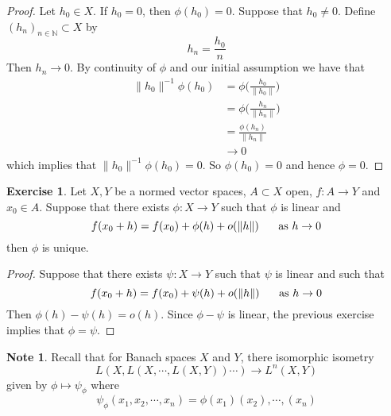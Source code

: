 \documentclass[12pt]{amsart}
\theoremstyle{definition}
\newtheorem{note}[definition]{Note}
\newtheorem{ex}[definition]{Exercise}
\newcommand{\N}{\mathbb{N}}
\DeclareMathOperator*{\0}{\mbf{0}}
\DeclareMathOperator*{\1}{\mbf{1}}
\newcommand{\lex}[1]{\label{ex:#1}}
\begin{document}
	\begin{proof}
	Let $h_0 \in X$. If $h_0 = 0$, then $\phi(h_0) = 0$. Suppose that $h_0 \neq 0$. Define $(h_n)_{n \in \N} \subset X$ by $$h_n = \frac{h_0}{n}$$ Then $h_n \rightarrow 0$. By continuity of $\phi$ and our initial assumption we have that 
	\begin{align*}
	\| h_0 \|^{-1} \phi ( h_0 ) 
	&= \phi \bigg( \frac{h_0}{\| h_0 \|} \bigg) \\
	&= \phi \bigg( \frac{h_n}{\| h_n \|} \bigg) \\
	&= \frac{\phi(h_n)}{\| h_n \|} \\
	& \rightarrow 0
	\end{align*}
	which implies that $\| h_0 \|^{-1}\phi ( h_0 ) = 0$. So $\phi(h_0) = 0$ and hence $\phi = 0$.
	\end{proof}
	
	\begin{ex} \lex{62002}
	Let $X, Y$ be a normed vector spaces, $A \subset X$ open, $f:A \rightarrow Y$ and $x_0 \in A$. Suppose that there exists $\phi: X \rightarrow Y$ such that $\phi$ is linear and $$f(x_0 + h) = f(x_0) + \phi(h) + o(\|h\| ) \hspace{.5cm} \text{ as } h \rightarrow 0$$ then $\phi$ is unique. 
	\end{ex}
	
	\begin{proof}
	Suppose that there exists $\psi : X \rightarrow Y$ such that $\psi$ is linear and such that
	$$f(x_0 + h) = f(x_0) + \psi(h) + o(\|h\| ) \hspace{.5cm} \text{ as } h \rightarrow 0$$ 
	Then $\phi(h) - \psi(h) = o(h)$. Since $\phi - \psi$ is linear, the previous exercise implies that $\phi = \psi$.
	\end{proof}
	
	\begin{note}
	Recall that for Banach spaces $X$ and $Y$, there isomorphic isometry $$L(X, L(X, \cdots, L(X, Y)) \cdots) \rightarrow L^n(X, Y)$$ given by $\phi \mapsto \psi_{\phi}$ where $$\psi_{\phi}(x_1, x_2, \cdots, x_n) = \phi(x_1)(x_2),\cdots,(x_n)$$
	\end{note}	
	
\end{document}
